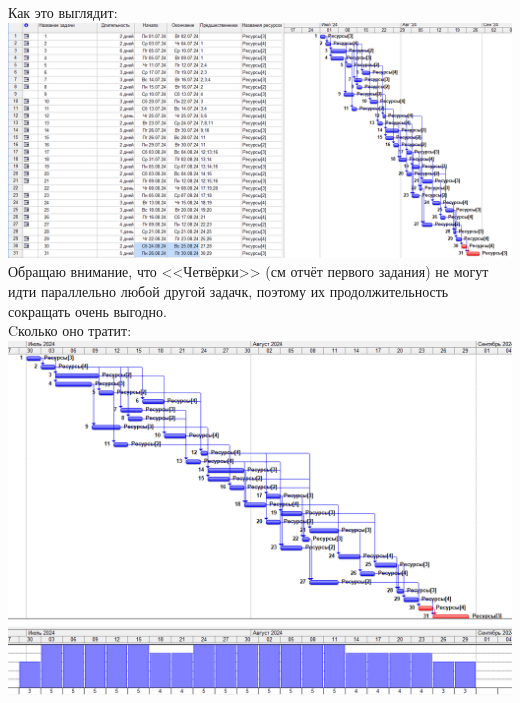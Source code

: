 \documentclass[14pt]{article}
\begin{document}
		{\LARGE Как это выглядит:}\\
		\includegraphics[width=\textwidth]{../img/ot2a1_1.png}\\
		Обращаю внимание, что <<Четвёрки>> (см отчёт первого задания) не могут идти параллельно любой другой задачк,
			поэтому их продолжительность сокращать очень выгодно.\\
		{\LARGE Cколько оно тратит:}\\
		\includegraphics[width=\textwidth]{../img/2a1_answer.png}\\ 
\end{document}
